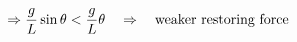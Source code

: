 \documentclass[preview]{standalone}
\begin{document}
\begin{align*}
\special{dvisvgm:raw <g id='unique000'>}\Rightarrow \frac{g}{L}\sin\theta < \frac{g}{L}\theta\quad \Rightarrow \quad \text{weaker restoring force}\special{dvisvgm:raw </g>}
\end{align*}
\end{document}
